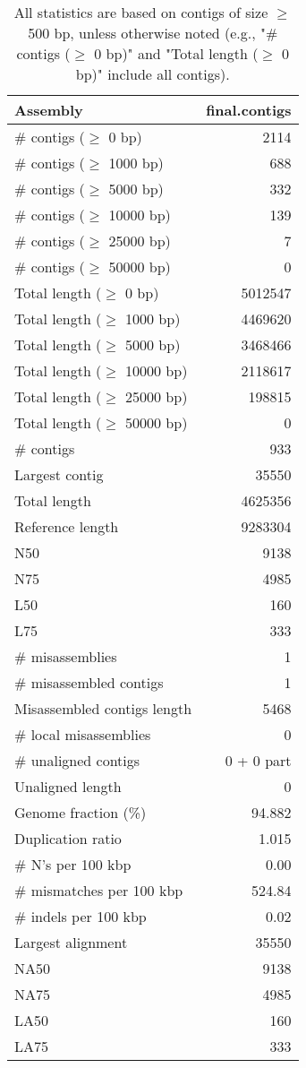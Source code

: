 \documentclass[12pt,a4paper]{article}
\begin{document}
\begin{table}[ht]
\begin{center}
\caption{All statistics are based on contigs of size $\geq$ 500 bp, unless otherwise noted (e.g., "\# contigs ($\geq$ 0 bp)" and "Total length ($\geq$ 0 bp)" include all contigs).}
\begin{tabular}{|l*{1}{|r}|}
\hline
Assembly & final.contigs \\ \hline
\# contigs ($\geq$ 0 bp) & 2114 \\ \hline
\# contigs ($\geq$ 1000 bp) & 688 \\ \hline
\# contigs ($\geq$ 5000 bp) & 332 \\ \hline
\# contigs ($\geq$ 10000 bp) & 139 \\ \hline
\# contigs ($\geq$ 25000 bp) & 7 \\ \hline
\# contigs ($\geq$ 50000 bp) & 0 \\ \hline
Total length ($\geq$ 0 bp) & 5012547 \\ \hline
Total length ($\geq$ 1000 bp) & 4469620 \\ \hline
Total length ($\geq$ 5000 bp) & 3468466 \\ \hline
Total length ($\geq$ 10000 bp) & 2118617 \\ \hline
Total length ($\geq$ 25000 bp) & 198815 \\ \hline
Total length ($\geq$ 50000 bp) & 0 \\ \hline
\# contigs & 933 \\ \hline
Largest contig & 35550 \\ \hline
Total length & 4625356 \\ \hline
Reference length & 9283304 \\ \hline
N50 & 9138 \\ \hline
N75 & 4985 \\ \hline
L50 & 160 \\ \hline
L75 & 333 \\ \hline
\# misassemblies & 1 \\ \hline
\# misassembled contigs & 1 \\ \hline
Misassembled contigs length & 5468 \\ \hline
\# local misassemblies & 0 \\ \hline
\# unaligned contigs & 0 + 0 part \\ \hline
Unaligned length & 0 \\ \hline
Genome fraction (\%) & 94.882 \\ \hline
Duplication ratio & 1.015 \\ \hline
\# N's per 100 kbp & 0.00 \\ \hline
\# mismatches per 100 kbp & 524.84 \\ \hline
\# indels per 100 kbp & 0.02 \\ \hline
Largest alignment & 35550 \\ \hline
NA50 & 9138 \\ \hline
NA75 & 4985 \\ \hline
LA50 & 160 \\ \hline
LA75 & 333 \\ \hline
\end{tabular}
\end{center}
\end{table}
\end{document}
